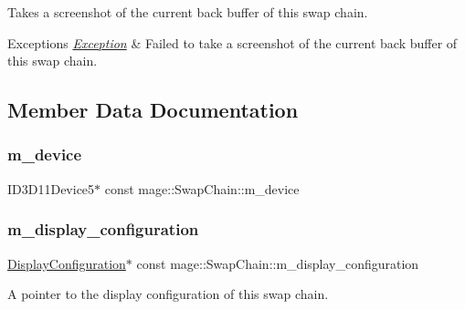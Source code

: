 Takes a screenshot of the current back buffer of this swap chain.


\begin{DoxyExceptions}{Exceptions}
{\em \hyperlink{classmage_1_1_exception}{Exception}} & Failed to take a screenshot of the current back buffer of this swap chain. \\
\hline
\end{DoxyExceptions}


\subsection{Member Data Documentation}
\hypertarget{classmage_1_1_swap_chain_a169f9613c42c3cad0ea83e9535676cd0}{}\label{classmage_1_1_swap_chain_a169f9613c42c3cad0ea83e9535676cd0} 
\subsubsection{\texorpdfstring{m\+\_\+device}{m\_device}}
{\footnotesize\ttfamily I\+D3\+D11\+Device5$\ast$ const mage\+::\+Swap\+Chain\+::m\+\_\+device\hspace{0.3cm}{\ttfamily [private]}}

\hypertarget{classmage_1_1_swap_chain_ac1aa833943aa6bfe464da32316f7096f}{}\label{classmage_1_1_swap_chain_ac1aa833943aa6bfe464da32316f7096f} 
\subsubsection{\texorpdfstring{m\+\_\+display\+\_\+configuration}{m\_display\_configuration}}
{\footnotesize\ttfamily \hyperlink{structmage_1_1_display_configuration}{Display\+Configuration}$\ast$ const mage\+::\+Swap\+Chain\+::m\+\_\+display\+\_\+configuration\hspace{0.3cm}{\ttfamily [private]}}

A pointer to the display configuration of this swap chain. \hypertarget{classmage_1_1_swap_chain_aea5964cd3bd2bfef89ae428cceef82fd}{}\label{classmage_1_1_swap_chain_aea5964cd3bd2bfef89ae428cceef82fd} 
